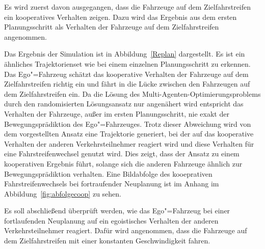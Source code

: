 Es wird zuerst davon ausgegangen, dass die Fahrzeuge auf dem Zielfahrstreifen ein kooperatives Verhalten zeigen.
Dazu wird das Ergebnis aus dem ersten Planungsschritt als Verhalten der Fahrzeuge auf dem Zielfahrstreifen angenommen.


Das Ergebnis der Simulation ist in Abbildung~\ref{Replan} dargestellt.
Es ist ein \"ahnliches Trajektorienset wie bei einem einzelnen Planungsschritt zu erkennen.
Das Ego"=Fahrzeug sch\"atzt das kooperative Verhalten der Fahrzeuge auf dem Zielfahrstreifen richtig ein und f\"ahrt in die L\"ucke zwischen den Fahrzeugen auf dem Zielfahrstreifen ein.
Da die L\"osung des Multi-Agenten-Optimierungsproblems durch den randomisierten L\"osungsansatz nur angen\"ahert wird entspricht das Verhalten der Fahrzeuge, au{\ss}er im ersten Planungsschritt, nie exakt der Bewegungspr\"adiktion des Ego"=Fahrzeuges.
Trotz dieser Abweichung wird von dem vorgestellten Ansatz eine Trajektorie generiert, bei der auf das kooperative Verhalten der anderen Verkehrsteilnehmer reagiert wird und diese Verhalten f\"ur eine Fahrstreifenwechsel genutzt wird.
Dies zeigt, dass der Ansatz zu einem kooperativen Ergebnis f\"uhrt, solange sich die anderen Fahrzeuge \"ahnlich zur Bewegungspr\"adiktion verhalten.
Eine Bildabfolge des kooeprativen Fahrstreifenwechsels bei fortraufender Neuplanung ist im Anhang im Abbildung~\ref{fig:abfolgecoop} zu sehen.


Es soll abschlie{\ss}end \"uberpr\"uft werden, wie das Ego"=Fahrzeug bei einer fortlaufenden Neuplanung auf ein egoistisches Verhalten der anderen Verkehrsteilnehmer reagiert.
Daf\"ur wird angenommen, dass die Fahrzeuge auf dem Zielfahrstreifen mit einer konstanten Geschwindigkeit fahren.

